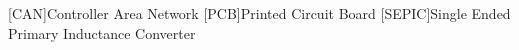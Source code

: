 
\begin{acronym}[ACRONYM]
[CAN]{Controller Area Network}
[PCB]{Printed Circuit Board}
[SEPIC]{Single Ended Primary Inductance Converter}
\end{acronym}\newpage

